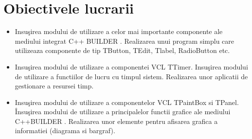 \documentclass[12pt]{article}
\begin{document}
\section*{Obiectivele lucrarii}
\begin{itemize}
\item Insuşirea modului de utilizare a celor mai importante componente ale mediului integrat C++ BUILDER . Realizarea unui program simplu care utilizeaza componente de tip TButton, TEdit, Tlabel, RadioButton  etc.  
\item Insuşirea modului de utilizare a componentei VCL TTimer. Insuşirea modului de utilizare a functiilor de lucru cu timpul sistem. Realizarea unor aplicatii de gestionare a resursei timp.
\item Insuşirea modului de utilizare a componentelor VCL  TPaintBox si TPanel. Însuşirea modului de utilizare a principalelor functii grafice ale mediului C++BUILDER . Realizarea unor elemente pentru  afisarea grafica a informatiei (diagrama si bargraf).
\end{itemize}
\end{document}
